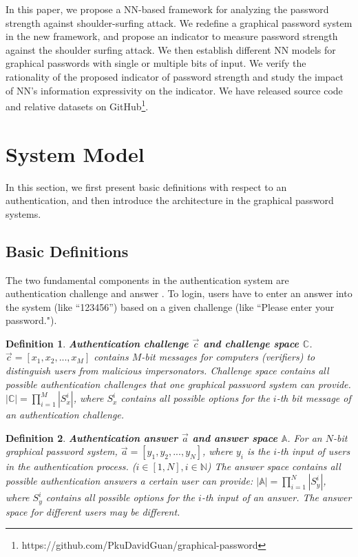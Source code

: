 \documentclass{article}
\newtheorem{definition}{Definition}
\begin{document}
In this paper, we propose a NN-based framework for analyzing the password strength against shoulder-surfing attack. We redefine a graphical password system in the new framework, and propose an indicator to measure password strength against the shoulder surfing attack. We then establish different NN models for graphical passwords with single or multiple bits of input. We verify the rationality of the proposed indicator of password strength and study the impact of NN's information expressivity on the indicator. We have released source code and relative datasets on GitHub\footnote{https://github.com/PkuDavidGuan/graphical-password}.


\section{System Model}\label{sec:preliminaries}

In this section, we first present basic definitions with respect to an authentication, and then introduce the architecture in the graphical password systems.

\subsection{Basic Definitions}
The two fundamental components in the authentication system are authentication challenge and answer \cite{DBLP:journals/corr/BlockiBD14}. To
login, users have to enter an answer into the system (like ``123456'') based on a given challenge (like ``Please
enter your password.").
\begin{definition}
\textbf{Authentication challenge $\vec c$ and challenge space $\mathbb{C}$}. $\vec c = [x_1, x_2,...,x_M]$ contains $M$-bit messages for computers (verifiers) to distinguish users from malicious impersonators. Challenge space contains all possible authentication challenges that one graphical password system can provide.
$|\mathbb{C}| = \prod\limits_{i=1}^{M}|S_x^i|$,
where $S_x^i$ contains all possible options for the $i$-th bit message of an authentication challenge.
\end{definition}

\begin{definition}
\textbf{Authentication answer $\vec a$ and answer space $\mathbb{A}$}. For an $N$-bit graphical password system, $\vec a = [y_1, y_2,...,y_N]$,
where $y_i$ is the $i$-th input of users in the authentication process. ($i \in [1, N], i \in \mathbb{N}$)
The answer space contains all possible authentication answers a certain user can provide:
$|\mathbb{A}| = \prod\limits_{i=1}^{N}|S_y^i|$,
where $S_y^i$ contains all possible options for the $i$-th input of an answer. The answer space for different users may be different.
\end{definition}
\end{document}
